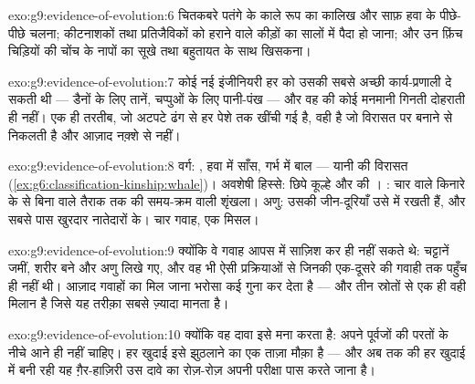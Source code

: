 \begin{solution}{exo:g9:evidence-of-evolution:6}
चितकबरे पतंगे के काले रूप का कालिख और साफ़ हवा के पीछे-पीछे चलना;
कीटनाशकों तथा प्रतिजैविकों को हराने वाले कीड़ों का सालों में पैदा हो
जाना; और उन फ़िंच चिड़ियों की चोंच के नापों का सूखे तथा बहुतायत के साथ
खिसकना।
\end{solution}

\begin{solution}{exo:g9:evidence-of-evolution:7}
कोई नई इंजीनियरी हर  को उसकी सबसे अच्छी कार्य-प्रणाली दे सकती थी ---
डैनों के लिए तानें, चप्पुओं के लिए पानी-पंख --- और वह  की कोई
मनमानी गिनती दोहराती ही नहीं। एक ही तरतीब, जो अटपटे ढंग से हर पेशे तक
खींची गई है, वही है जो विरासत पर बनाने से निकलती है और आज़ाद नक़्शे से
नहीं।
\end{solution}

\begin{solution}{exo:g9:evidence-of-evolution:8}
वर्ग: , हवा में साँस, गर्भ में बाल --- यानी  की विरासत
(\cref{ex:g6:classification-kinship:whale})। अवशेषी हिस्से: छिपे कूल्हे
और  की । : चार  वाले किनारे के  से बिना
 वाले तैराक तक की समय-क्रम वाली शृंखला। अणु: उसकी जीन-दूरियाँ उसे
 में रखती हैं, और सबसे पास खुरदार नातेदारों के। चार गवाह, एक
मिसल।
\end{solution}

\begin{solution}{exo:g9:evidence-of-evolution:9}
क्योंकि वे गवाह आपस में साज़िश कर ही नहीं सकते थे: चट्टानें जमीं, शरीर
बने और अणु लिखे गए, और वह भी ऐसी प्रक्रियाओं से जिनकी एक-दूसरे की गवाही
तक पहुँच ही नहीं थी। आज़ाद गवाहों का मिल जाना भरोसा कई गुना कर देता है
--- और तीन स्रोतों से एक ही  वही मिलान है जिसे यह तरीक़ा सबसे
ज़्यादा मानता है।
\end{solution}

\begin{solution}{exo:g9:evidence-of-evolution:10}
क्योंकि वह दावा इसे मना करता है:  अपने पूर्वजों की परतों के नीचे
आने ही नहीं चाहिए। हर खुदाई इसे झुठलाने का एक ताज़ा मौक़ा है --- और अब तक
की हर खुदाई में बनी रही यह ग़ैर-हाज़िरी उस दावे का रोज़-रोज़ अपनी परीक्षा
पास करते जाना है।
\end{solution}

